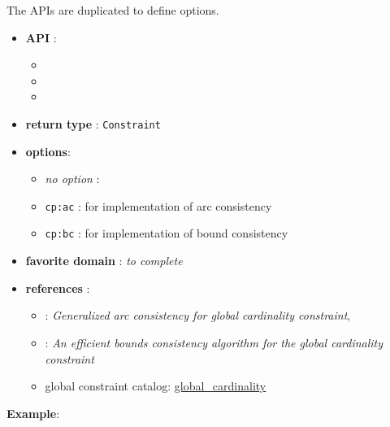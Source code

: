 The APIs are duplicated to define options. 

\begin{itemize}
	\item \textbf{API} :
      \begin{itemize}
	\item {}
	\item {}
	\item {}
      \end{itemize}
	\item \textbf{return type} : \texttt{Constraint}
	\item \textbf{options}:
	\begin{itemize}
		\item \emph{no option} :
		\item \texttt{cp:ac} : for \cite{ReginAAAI96} implementation of arc consistency
		\item \texttt{cp:bc} : for  \cite{QuimperCP03} implementation of bound consistency
	\end{itemize}
	\item \textbf{favorite domain} : \emph{to complete}
	\item \textbf{references} :
      \begin{itemize}
      \item \cite{ReginAAAI96}: \emph{Generalized arc consistency for global cardinality constraint},
      \item \cite{QuimperCP03}: \emph{An efficient bounds consistency algorithm for the global cardinality constraint}
      \item global constraint catalog: \href{http://www.emn.fr/x-info/sdemasse/gccat/Cglobal_cardinality.html}{global\_cardinality}
      \end{itemize}
\end{itemize}

\textbf{Example}:

